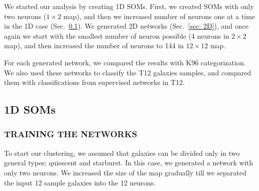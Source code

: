 \documentclass[useAMS,usenatbib]{mn2e}
\begin{document}
    We started our analysis by creating 1D SOMs. 
    First, we created SOMs with only two neurons ($1\times2$ map), and then we increased number of neurons one at a time in the 1D case (Sec.~\ref{sec: 1D}).
    We generated 2D networks (Sec.~\ref{sec: 2D}), and once again we start with the smallest number of neuron possible (4 neurons in $2\times2$ map), and then increased the number of neurons to 144 in $12\times12$ map.
    
    For each generated network, we compared the results with K96 categorization.
    We also used these networks to classify the T12 galaxies samples, and compared them with classifications from supervised networks in T12.
    \subsection{1D SOMs}
    \label{sec: 1D}
        \subsubsection{TRAINING THE NETWORKS}
        \label{sec: 1Dt}
            To start our clustering, we assumed that galaxies can be divided only in two general types; quiescent and starburst.
            In this case, we generated a network with only two neurons.
            We increased the size of the map gradually till we separated the input 12 sample galaxies into the 12 neurons. 
        
\end{document}
